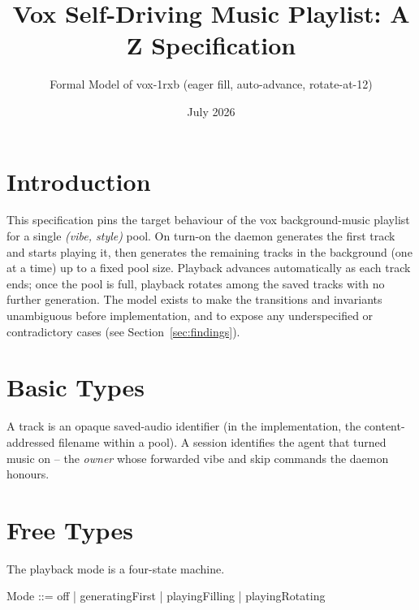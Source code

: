\documentclass[a4paper,10pt,fleqn]{article}
\begin{document}
\title{Vox Self-Driving Music Playlist: A Z Specification}
\author{Formal Model of vox-1rxb (eager fill, auto-advance, rotate-at-12)}
\date{July 2026}
\maketitle

\tableofcontents
\newpage

\section{Introduction}

This specification pins the target behaviour of the vox background-music
playlist for a single \emph{(vibe, style)} pool. On turn-on the daemon
generates the first track and starts playing it, then generates the
remaining tracks in the background (one at a time) up to a fixed pool
size. Playback advances automatically as each track ends; once the pool
is full, playback rotates among the saved tracks with no further
generation. The model exists to make the transitions and invariants
unambiguous before implementation, and to expose any underspecified or
contradictory cases (see Section~\ref{sec:findings}).

\section{Basic Types}

A track is an opaque saved-audio identifier (in the implementation, the
content-addressed filename within a pool). A session identifies the agent
that turned music on -- the \emph{owner} whose forwarded vibe and skip
commands the daemon honours.

\begin{zed}
\end{zed}

\section{Free Types}

The playback mode is a four-state machine.

\begin{zed}
  Mode ::= off | generatingFirst | playingFilling | playingRotating
\end{zed}
\end{document}
